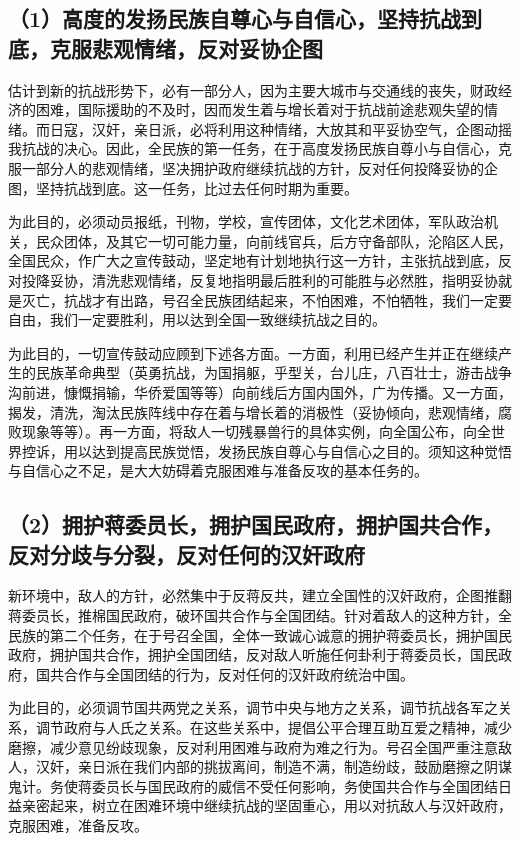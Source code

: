 \subsection{（1）高度的发扬民族自尊心与自信心，坚持抗战到底，克服悲观情绪，反对妥协企图}

估计到新的抗战形势下，必有一部分人，因为主要大城市与交通线的丧失，财政经济的困难，国际援助的不及时，因而发生着与增长着对于抗战前途悲观失望的情绪。而日寇，汉奸，亲日派，必将利用这种情绪，大放其和平妥协空气，企图动摇我抗战的决心。因此，全民族的第一任务，在于高度发扬民族自尊小与自信心，克服一部分人的悲观情绪，坚决拥护政府继续抗战的方针，反对任何投降妥协的企图，坚持抗战到底。这一任务，比过去任何时期为重要。

为此目的，必须动员报纸，刊物，学校，宣传团体，文化艺术团体，军队政治机关，民众团体，及其它一切可能力量，向前线官兵，后方守备部队，沦陷区人民，全国民众，作广大之宣传鼓动，坚定地有计划地执行这一方针，主张抗战到底，反对投降妥协，清洗悲观情绪，反复地指明最后胜利的可能胜与必然胜，指明妥协就是灭亡，抗战才有出路，号召全民族团结起来，不怕困难，不怕牺牲，我们一定要自由，我们一定要胜利，用以达到全国一致继续抗战之目的。

为此目的，一切宣传鼓动应顾到下述各方面。一方面，利用已经产生并正在继续产生的民族革命典型（英勇抗战，为国捐躯，乎型关，台儿庄，八百壮士，游击战争沟前进，慷慨捐输，华侨爱国等等）向前线后方国内国外，广为传播。又一方面，揭发，清洗，淘汰民族阵线中存在着与增长着的消极性（妥协倾向，悲观情绪，腐败现象等等）。再一方面，将敌人一切残暴兽行的具体实例，向全国公布，向全世界控诉，用以达到提高民族觉悟，发扬民族自尊心与自信心之目的。须知这种觉悟与自信心之不足，是大大妨碍着克服困难与准备反攻的基本任务的。

\subsection{（2）拥护蒋委员长，拥护国民政府，拥护国共合作，反对分歧与分裂，反对任何的汉奸政府}

新环境中，敌人的方针，必然集中于反蒋反共，建立全国性的汉奸政府，企图推翻蒋委员长，推棉国民政府，破环国共合作与全国团结。针对着敌人的这种方针，全民族的第二个任务，在于号召全国，全体一致诚心诚意的拥护蒋委员长，拥护国民政府，拥护国共合作，拥护全国团结，反对敌人听施任何卦利于蒋委员长，国民政府，国共合作与全国团结的行为，反对任何的汉奸政府统治中国。

为此目的，必须调节国共两党之关系，调节中央与地方之关系，调节抗战各军之关系，调节政府与人氏之关系。在这些关系中，提倡公平合理互助互爱之精神，减少磨擦，减少意见纷歧现象，反对利用困难与政府为难之行为。号召全国严重注意敌人，汉奸，亲日派在我们内部的挑拔离间，制造不满，制造纷歧，鼓励磨擦之阴谋鬼计。务使蒋委员长与国民政府的威信不受任何影响，务使国共合作与全国团结日益亲密起来，树立在困难环境中继续抗战的坚固重心，用以对抗敌人与汉奸政府，克服困难，准备反攻。

